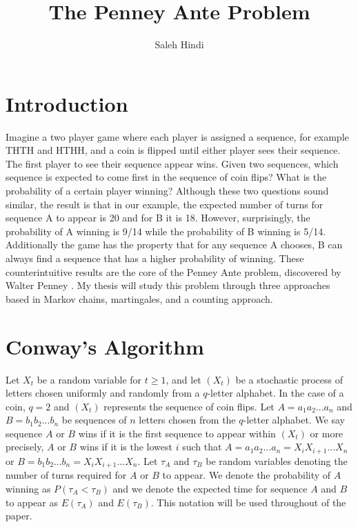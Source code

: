 \documentclass{article}
\numberwithin{mytheorem}{subsection} %
\begin{document}
	\title{The Penney Ante Problem}
	\author{Saleh Hindi}

	\maketitle

	\section{Introduction}
		Imagine a two player game where
		each player is assigned a sequence, for example THTH and HTHH, and a coin is flipped until either player sees their sequence.
		The first player to see their sequence appear wins.
		Given two sequences, which sequence is expected to come first in the
		sequence of coin flips? What is the probability of a certain player winning? Although these two
		questions sound similar, the result is that in our example,
		the expected number of turns for sequence A to appear is 20 and for B it is 18. However, surprisingly, the probability
		of A winning is 9/14 while the probability of B winning is 5/14. Additionally the game has the property
		that for any sequence A chooses, B can always find a sequence that has a higher probability of winning.
		These counterintuitive results are the core of the Penney Ante problem, discovered by Walter Penney
		\cite{gardner}. My thesis will study this problem through three approaches based in Markov chains, martingales,
		and a counting approach.

	\section{Conway's Algorithm}
		Let $X_t$ be a random variable for $t \geq 1$, and let $(X_t)$ be a stochastic process of letters chosen uniformly and
		randomly from a $q$-letter alphabet. In the case of a coin, $q=2$ and $(X_t)$ represents the sequence of coin flips. Let $A=a_1a_2...a_n$ and $B=b_1b_2...b_n$ be sequences
		of $n$ letters chosen from the $q$-letter alphabet. We say
		sequence $A$ or $B$ wins if it is the first sequence to appear within $(X_t)$ or more precisely, $A$ or $B$ wins if it is the lowest $i$ such that $A = a_1a_2...a_n = X_iX_{i+1}...X_n$ or $B = b_1b_2...b_n = X_iX_{i+1}...X_n$. Let $\tau_A$ and $\tau_B$ be random variables denoting
		the number of turns required for $A$ or $B$ to appear. We denote
		the probability of $A$ winning as $P(\tau_A < \tau_B)$ and we denote the expected time for sequence
		$A$ and $B$ to appear as $E(\tau_A)$ and $E(\tau_B)$. This notation will be used throughout of the paper. 
\end{document}
